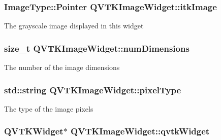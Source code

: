 \hypertarget{class_q_v_t_k_image_widget_ae5b308466d4f198990b9d132319f9f34}{
\subsubsection[{itk\-Image}]{\setlength{\rightskip}{0pt plus 5cm}Image\-Type\-::\-Pointer {\bf Q\-V\-T\-K\-Image\-Widget\-::itk\-Image}}}\label{d8/dd7/class_q_v_t_k_image_widget_ae5b308466d4f198990b9d132319f9f34}
The grayscale image displayed in this widget \hypertarget{class_q_v_t_k_image_widget_a6aff403421ea538248d48116a942271b}{
\subsubsection[{num\-Dimensions}]{\setlength{\rightskip}{0pt plus 5cm}size\-\_\-t {\bf Q\-V\-T\-K\-Image\-Widget\-::num\-Dimensions}}}\label{d8/dd7/class_q_v_t_k_image_widget_a6aff403421ea538248d48116a942271b}
The number of the image dimensions \hypertarget{class_q_v_t_k_image_widget_a067b78e68ed458d840ad1cf0d16b4ad6}{
\subsubsection[{pixel\-Type}]{\setlength{\rightskip}{0pt plus 5cm}std\-::string {\bf Q\-V\-T\-K\-Image\-Widget\-::pixel\-Type}}}\label{d8/dd7/class_q_v_t_k_image_widget_a067b78e68ed458d840ad1cf0d16b4ad6}
The type of the image pixels \hypertarget{class_q_v_t_k_image_widget_a461f6ca20211ec9ff4b367aeb95e8139}{
\subsubsection[{qvtk\-Widget}]{\setlength{\rightskip}{0pt plus 5cm}Q\-V\-T\-K\-Widget$\ast$ {\bf Q\-V\-T\-K\-Image\-Widget\-::qvtk\-Widget}}}\label{d8/dd7/class_q_v_t_k_image_widget_a461f6ca20211ec9ff4b367aeb95e8139}
